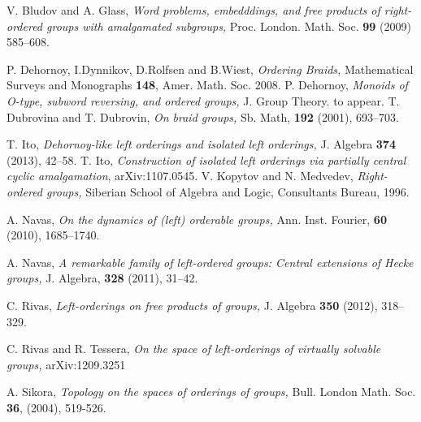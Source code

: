 \documentclass[10pt]{amsart}
\numberwithin{equation}{section}
\begin{document}
\begin{thebibliography}{1}

 V. Bludov and A. Glass,
{\em{Word problems, embedddings, and free products of right-ordered groups with amalgamated subgroups,}} 
Proc. London. Math. Soc. \textbf{99} (2009) 585--608.

 P. Dehornoy, I.Dynnikov, D.Rolfsen and B.Wiest, 
{\em{Ordering Braids,}}
Mathematical Surveys and Monographs \textbf{148}, Amer. Math. Soc. 2008.
 P. Dehornoy,
{\em{Monoids of O-type, subword reversing, and ordered groups,}}
J. Group Theory. to appear.
 T. Dubrovina and T. Dubrovin,
{\em{On braid groups,}}
Sb. Math, \textbf{192} (2001), 693--703.

 T. Ito, 
{\em{Dehornoy-like left orderings and isolated left orderings,}}
J. Algebra \textbf{374} (2013), 42--58.
 T. Ito,
{\em{Construction of isolated left orderings via partially central cyclic amalgamation}},
arXiv:1107.0545.
 V. Kopytov and N. Medvedev,
{\em{Right-ordered groups,}}
Siberian School of Algebra and Logic, Consultants Bureau, 1996.

 A. Navas,
{\em{On the dynamics of (left) orderable groups,}}
Ann. Inst. Fourier,  \textbf{60}  (2010), 1685--1740.

 A. Navas,
{\em{A remarkable family of left-ordered groups: Central extensions of Hecke groups,}}
J. Algebra, \textbf{328}  (2011), 31--42.

 C. Rivas,
{\em{Left-orderings on free products of groups,}}
J. Algebra \textbf{350} (2012), 318--329.

 C. Rivas and R. Tessera,
{\em{On the space of left-orderings of virtually solvable groups,}}
arXiv:1209.3251

 A. Sikora,
{\em{Topology on the spaces of orderings of groups,}}
Bull. London Math. Soc. \textbf{36}, (2004), 519-526.

\end{thebibliography}
\end{document}
